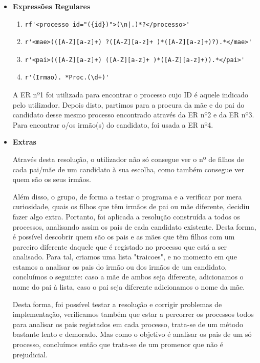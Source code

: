 \documentclass[11pt,a4paper]{report}
\begin{document}
	\begin{itemize}
		\item \textbf{Expressões Regulares}

			 \begin{enumerate}
				\item \begin{verbatim}rf'<processo id="({id})">(\n|.)*?</processo>'  \end{verbatim} 
				\item \begin{verbatim}r'<mae>(([A-Z][a-z]+) ?([A-Z][a-z]+ )*([A-Z][a-z]+)?).*</mae>'  \end{verbatim} 
				\item \begin{verbatim}r'<pai>(([A-Z][a-z]+) ([A-Z][a-z]+ )*([A-Z][a-z]+)).*</pai>'  \end{verbatim} 
				\item \begin{verbatim}r'(Irmao). *Proc.(\d+)'  \end{verbatim} 
			\end{enumerate}

	\qquad A ER nº1 foi utilizada para encontrar o processo cujo ID é aquele indicado pelo utilizador. Depois disto, partimos para a procura da mãe e do pai do candidato desse mesmo processo encontrado através da ER nº2 e da ER nº3. Para encontrar o/os irmão(s) do candidato, foi usada a ER nº4.\par
		
		\item \textbf{Extras}\par
\vspace{0.5cm}
	\qquad Através desta resolução, o utilizador não só consegue ver o nº de filhos de cada pai/mãe de um candidato à sua escolha, como também consegue ver quem são os seus irmãos.\par
	\qquad Além disso, o grupo, de forma a testar o programa e a verificar por mera curiosidade, quais os filhos que têm irmãos de pai ou mãe diferente, decidiu fazer algo extra. Portanto, foi aplicada a resolução construída a todos os processos, analisando assim os pais de cada candidato existente. Desta forma, é possível descobrir quem são os pais e as mães que têm filhos com um parceiro diferente daquele que é registado no processo que está a ser analisado. Para tal, criamos uma lista "traicoes", e no momento em que estamos a analisar os pais do irmão ou dos irmãos de um candidato, concluímos o seguinte: caso a mãe de ambos seja diferente, adicionamos o nome do pai à lista, caso o pai seja diferente adicionamos o nome da mãe.\par
	\qquad Desta forma, foi possível testar a resolução e corrigir problemas de implementação, verificamos também que estar a percorrer os processos todos para analisar os pais registados em cada processo, trata-se de um método bastante lento e demorado. Mas como o objetivo é analisar os pais de um só processo, concluímos então que trata-se de um promenor que não é prejudicial.

	\end{itemize}
\end{document}
